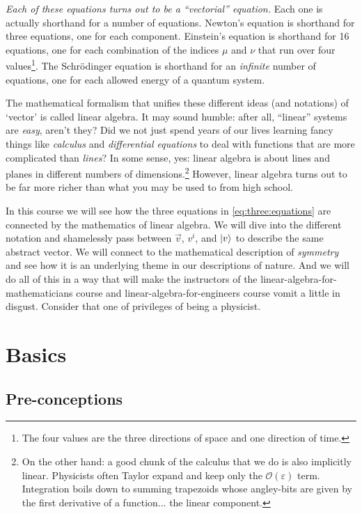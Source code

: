 \documentclass[12pt]{article}
\begin{document}
\emph{Each of these equations turns out to be a ``vectorial'' equation.} Each one is actually shorthand for a number of equations. Newton's equation is shorthand for three equations, one for each component. Einstein's equation is shorthand for 16 equations, one for each combination of the indices $\mu$ and $\nu$ that run over four values\footnote{The four values are the three directions of space and one direction of time.}. The Schr\"odinger equation is shorthand for an \emph{infinite} number of equations, one for each allowed energy of a quantum system.

The mathematical formalism that unifies these different ideas (and notations) of `vector' is called linear algebra. It may sound humble: after all, ``linear'' systems are \emph{easy}, aren't they? Did we not just spend years of our lives learning fancy things like \emph{calculus} and \emph{differential equations} to deal with functions that are more complicated than \emph{lines}? In some sense, yes: linear algebra is about lines and planes in different numbers of dimensions.\footnote{On the other hand: a good chunk of the calculus that we do is also implicitly linear. Physicists often Taylor expand and keep only the $\mathcal O(\varepsilon)$ term. Integration boils down to summing trapezoids whose angley-bits are given by the first derivative of a function... the linear component.} However, linear algebra turns out to be far more richer than what you may be used to from high school. 

In this course we will see how the three equations in \eqref{eq:three:equations} are connected by the mathematics of linear algebra. We will dive into the different notation and shamelessly pass between $\vec{v}$, $v^i$, and $\left|v\right\rangle$ to describe the same abstract vector. We will connect to the mathematical description of \emph{symmetry} and see how it is an underlying theme in our descriptions of nature. And we will do all of this in a way that will make the instructors of the linear-algebra-for-mathematicians course and linear-algebra-for-engineers course vomit a little in disgust. Consider that one of privileges of being a physicist.


\section{Basics}

\subsection{Pre-conceptions}
\end{document}
